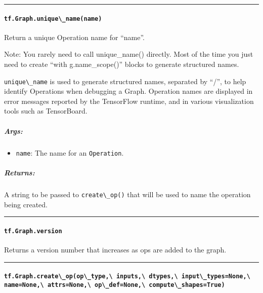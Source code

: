 \begin{center}\rule{0.5\linewidth}{\linethickness}\end{center}

\paragraph{\texorpdfstring{\lstinline{tf.Graph.unique\_name(name)}
}{tf.Graph.unique\_name(name) }}\label{tf.graph.uniqueux5fnamename}

Return a unique Operation name for ``name''.

Note: You rarely need to call unique\_name() directly. Most of the time
you just need to create ``with g.name\_scope()'' blocks to generate
structured names.

\lstinline{unique\_name} is used to generate structured names, separated by
``/'', to help identify Operations when debugging a Graph. Operation
names are displayed in error messages reported by the TensorFlow
runtime, and in various visualization tools such as TensorBoard.

\subparagraph{Args: }\label{args-9}

\begin{itemize}
\tightlist
\item
  \lstinline{name}: The name for an \lstinline{Operation}.
\end{itemize}

\subparagraph{Returns: }\label{returns-11}

A string to be passed to \lstinline{create\_op()} that will be used to name
the operation being created.

\begin{center}\rule{0.5\linewidth}{\linethickness}\end{center}

\paragraph{\texorpdfstring{\lstinline{tf.Graph.version}
}{tf.Graph.version }}\label{tf.graph.version}

Returns a version number that increases as ops are added to the graph.

\begin{center}\rule{0.5\linewidth}{\linethickness}\end{center}

\paragraph{\texorpdfstring{\lstinline{tf.Graph.create\_op(op\_type,\ inputs,\ dtypes,\ input\_types=None,\ name=None,\ attrs=None,\ op\_def=None,\ compute\_shapes=True)}
}{tf.Graph.create\_op(op\_type, inputs, dtypes, input\_types=None, name=None, attrs=None, op\_def=None, compute\_shapes=True) }}\label{tf.graph.createux5fopopux5ftype-inputs-dtypes-inputux5ftypesnone-namenone-attrsnone-opux5fdefnone-computeux5fshapestrue}

